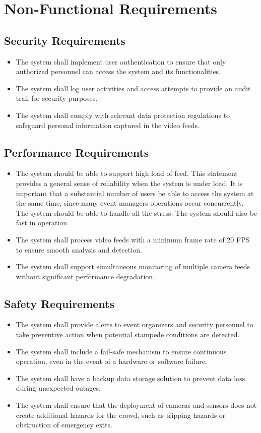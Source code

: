 \documentclass[11pt]{report}
\begin{document}
\section{Non-Functional Requirements}
\subsection{Security Requirements}
\begin{itemize}
    \item The system shall implement user authentication to ensure that only authorized personnel can access the system and its functionalities. 
    \item The system shall log user activities and access attempts to provide an audit trail for security purposes.
    \item The system shall comply with relevant data protection regulations to safeguard personal information captured in the video feeds.
\end{itemize}

\subsection{Performance Requirements}
\begin{itemize}
    \item The system should be able to support high load of feed. This statement provides a general sense of reliability when the system is under load. It is important that a substantial number of users be able to access the system at the same time, since many event managers operations occur concurrently. The system should be able to handle all the stress. The system should also be fast in operation
    \item The system shall process video feeds with a minimum frame rate of 20 FPS to ensure smooth analysis and detection.
    \item The system shall support simultaneous monitoring of multiple camera feeds without significant performance degradation.
\end{itemize}

\subsection{Safety Requirements}
\begin{itemize}
    \item The system shall provide alerts to event organizers and security personnel to take preventive action when potential stampede conditions are detected.
    \item The system shall include a fail-safe mechanism to ensure continuous operation, even in the event of a hardware or software failure.
    \item The system shall have a backup data storage solution to prevent data loss during unexpected outages.
    \item The system shall ensure that the deployment of cameras and sensors does not create additional hazards for the crowd, such as tripping hazards or obstruction of emergency exits.
\end{itemize}
\end{document}
